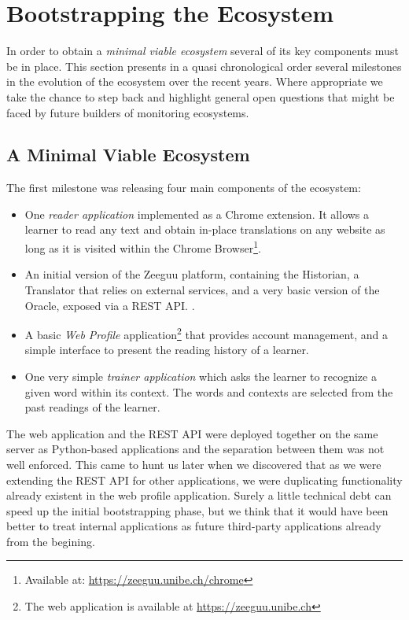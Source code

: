 

\section {Bootstrapping the Ecosystem}

In order to obtain a {\em minimal viable ecosystem} several of its key components must be in place. This section presents in a quasi chronological order several milestones in the evolution of the  ecosystem over the recent years. Where appropriate we take the chance to step back and highlight general open questions that might be faced by future builders of monitoring ecosystems. 

\subsection {A Minimal Viable Ecosystem}
The first milestone was releasing four main components of the ecosystem: 

\begin{itemize}
	\item One {\em reader application} implemented as a Chrome extension. It allows a learner to read any text and obtain in-place translations on any website as long as it is visited within the Chrome Browser\footnote{Available at: \url{https://zeeguu.unibe.ch/chrome}}. 

	\item An initial version of the Zeeguu platform, containing the Historian, a Translator that relies on external services, and a very basic version of the Oracle, exposed via a REST API. \cite{Lung16zeeguu}. 

	\item A basic {\em Web Profile} application\footnote{The web application is available at \url{https://zeeguu.unibe.ch}} that provides account management, and a simple interface to present the reading history of a learner. 

	\item One very simple {\em trainer application} which asks the learner to recognize a given word within its context. The words and contexts are selected from the past readings of the learner.

\end{itemize}

The web application and the REST API were deployed together on the same server as Python-based applications and the separation between them was not well enforced. This came to hunt us later when we discovered that as we were extending the REST API for other applications, we were duplicating functionality already existent in the web profile application. Surely a little technical debt can speed up the initial bootstrapping phase, but we think that it would have been better to treat internal applications as future third-party applications already from the begining.  


